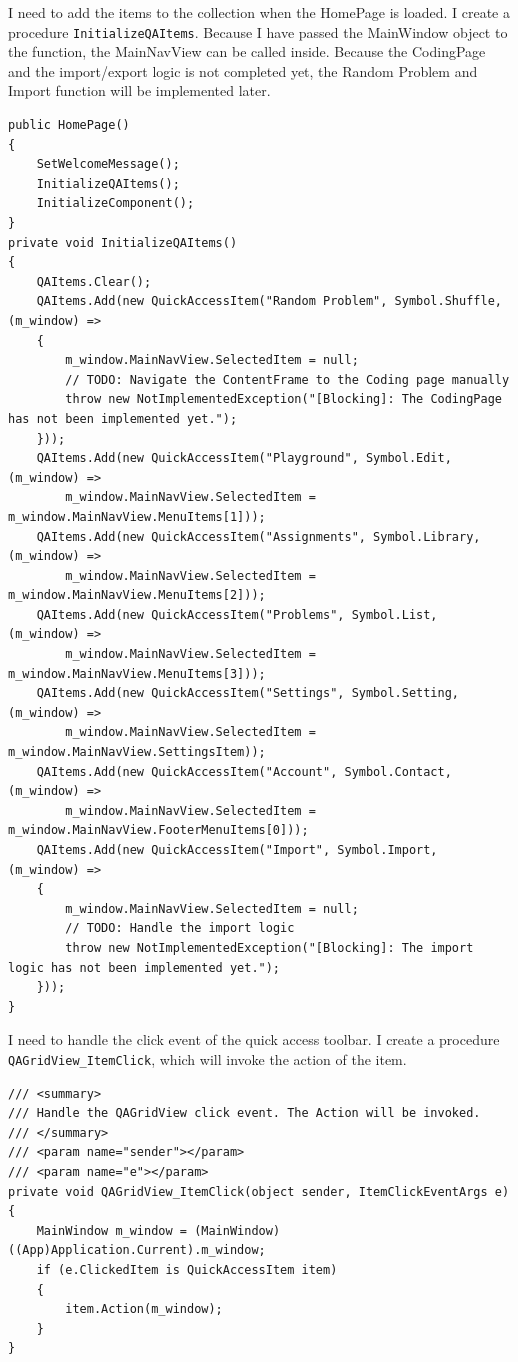 \documentclass[a4paper]{report}
\begin{document}
I need to add the items to the collection when the HomePage is loaded. I create a procedure \verb|InitializeQAItems|. Because I have passed the MainWindow object to the function, the MainNavView can be called inside. Because the CodingPage and the import/export logic is not completed yet, the Random Problem and Import function will be implemented later.

\begin{verbatim}
public HomePage()
{
    SetWelcomeMessage();
    InitializeQAItems();
    InitializeComponent();
}
private void InitializeQAItems()
{
    QAItems.Clear();
    QAItems.Add(new QuickAccessItem("Random Problem", Symbol.Shuffle, (m_window) =>
    {
        m_window.MainNavView.SelectedItem = null;
        // TODO: Navigate the ContentFrame to the Coding page manually
        throw new NotImplementedException("[Blocking]: The CodingPage has not been implemented yet.");
    }));
    QAItems.Add(new QuickAccessItem("Playground", Symbol.Edit, (m_window) =>
        m_window.MainNavView.SelectedItem = m_window.MainNavView.MenuItems[1]));
    QAItems.Add(new QuickAccessItem("Assignments", Symbol.Library, (m_window) =>
        m_window.MainNavView.SelectedItem = m_window.MainNavView.MenuItems[2]));
    QAItems.Add(new QuickAccessItem("Problems", Symbol.List, (m_window) =>
        m_window.MainNavView.SelectedItem = m_window.MainNavView.MenuItems[3]));
    QAItems.Add(new QuickAccessItem("Settings", Symbol.Setting, (m_window) =>
        m_window.MainNavView.SelectedItem = m_window.MainNavView.SettingsItem));
    QAItems.Add(new QuickAccessItem("Account", Symbol.Contact, (m_window) =>
        m_window.MainNavView.SelectedItem = m_window.MainNavView.FooterMenuItems[0]));
    QAItems.Add(new QuickAccessItem("Import", Symbol.Import, (m_window) =>
    {
        m_window.MainNavView.SelectedItem = null;
        // TODO: Handle the import logic
        throw new NotImplementedException("[Blocking]: The import logic has not been implemented yet.");
    }));
}
\end{verbatim}

I need to handle the click event of the quick access toolbar. I create a procedure \verb|QAGridView_ItemClick|, which will invoke the action of the item.

\begin{verbatim}
/// <summary>
/// Handle the QAGridView click event. The Action will be invoked.
/// </summary>
/// <param name="sender"></param>
/// <param name="e"></param>
private void QAGridView_ItemClick(object sender, ItemClickEventArgs e)
{
    MainWindow m_window = (MainWindow)((App)Application.Current).m_window;
    if (e.ClickedItem is QuickAccessItem item)
    {
        item.Action(m_window);
    }
}
\end{verbatim}
\end{document}
